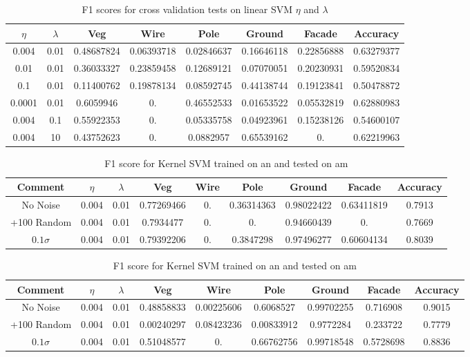 \documentclass[10pt,a4paper]{article}
\begin{document}
\begin{table}
\centering
\begin{tabular}{||c|c||c|c|c|c|c|c||}
\hline
$\eta$&$\lambda$&Veg & Wire & Pole & Ground & Facade & Accuracy\\ \hline
0.004 & 0.01 &  0.48687824 &  0.06393718 &  0.02846637 &  0.16646118 & 0.22856888 & 0.63279377\\ \hline
0.01 & 0.01 & 0.36033327 & 0.23859458 & 0.12689121 & 0.07070051 & 0.20230931 &  0.59520834\\ \hline
0.1 & 0.01 & 0.11400762 & 0.19878134 & 0.08592745 & 0.44138744 & 0.19123841 & 0.50478872\\ \hline
0.0001 & 0.01 &  0.6059946 &  0.    &      0.46552533 & 0.01653522 & 0.05532819 & 0.62880983 \\ \hline
0.004 & 0.1 & 0.55922353 & 0.  &        0.05335758 & 0.04923961 & 0.15238126 & 0.54600107\\ \hline
0.004 & 10 &  0.43752623 & 0.  &        0.0882957 &  0.65539162 & 0. & 0.62219963  \\ \hline
\end{tabular}
\caption{F1 scores for cross validation tests on linear SVM $\eta$ and $\lambda$}
\label{cross_svm}
\end{table}

\begin{table}[h]
\centering
\begin{tabular}{||c|c|c||c|c|c|c|c||c||}
\hline
Comment&$\eta$&$\lambda$&Veg & Wire & Pole & Ground & Facade & Accuracy\\ \hline
No Noise&0.004 & 0.01 &0.77269466  & 0.         &  0.36314363  & 0.98022422   &0.63411819  & 0.7913\\ \hline
+100 Random&0.004 & 0.01 &  0.7934477 &  0.     &     0.         & 0.94660439 & 0. &  0.7669\\ \hline
$0.1 \sigma$&0.004 & 0.01 & 0.79392206  & 0.     &      0.3847298   & 0.97496277  & 0.60604134 & 0.8039\\ \hline
\end{tabular}
\caption{F1 score for Kernel SVM trained on am and tested on an}
\vspace{10pt}
\begin{tabular}{||c|c|c||c|c|c|c|c||c||}
\hline
Comment&$\eta$&$\lambda$&Veg & Wire & Pole & Ground & Facade & Accuracy\\ \hline
No Noise&0.004 & 0.01 & 0.48858833   &0.00225606  &0.6068527   & 0.99702255 &  0.716908  & 0.9015 \\ \hline
+100 Random&0.004 & 0.01 & 0.00240297 &  0.08423236  & 0.00833912 &  0.9772284&
   0.233722 &0.7779\\ \hline
$0.1 \sigma$&0.004 & 0.01 &  0.51048577  & 0.      &     0.66762756  & 0.99718548  & 0.5728698  &0.8836\\ \hline
\end{tabular}
\caption{F1 score for Kernel SVM trained on an and tested on am}
\label{svm_tab}
\end{table}
\end{document}
